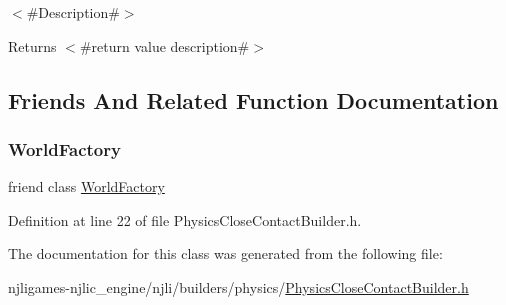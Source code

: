 $<$\#\+Description\#$>$

\begin{DoxyReturn}{Returns}
$<$\#return value description\#$>$ 
\end{DoxyReturn}


\subsection{Friends And Related Function Documentation}
\mbox{\label{classnjli_1_1_physics_close_contact_builder_acb96ebb09abe8f2a37a915a842babfac}} 
\subsubsection{\texorpdfstring{World\+Factory}{WorldFactory}}
{\footnotesize\ttfamily friend class \mbox{\hyperlink{classnjli_1_1_world_factory}{World\+Factory}}\hspace{0.3cm}{\ttfamily [friend]}}



Definition at line 22 of file Physics\+Close\+Contact\+Builder.\+h.



The documentation for this class was generated from the following file\+:\begin{DoxyCompactItemize}
\item 
njligames-\/njlic\+\_\+engine/njli/builders/physics/\mbox{\hyperlink{_physics_close_contact_builder_8h}{Physics\+Close\+Contact\+Builder.\+h}}\end{DoxyCompactItemize}
